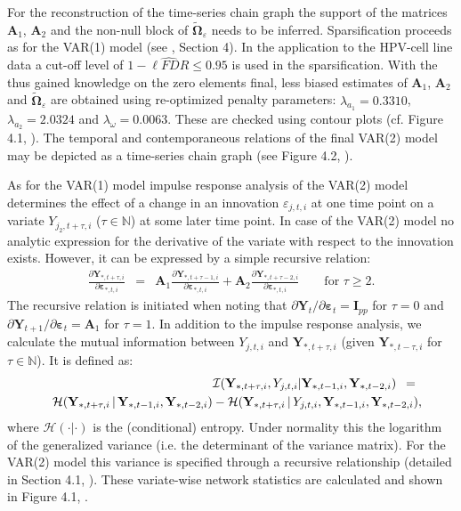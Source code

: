 For the reconstruction of the time-series chain graph the support of the matrices $\mathbf{A}_1$, $\mathbf{A}_2$ and the non-null block  of $\tilde{\mathbf{\Omega}}_{\varepsilon}$ needs to be inferred. Sparsification proceeds as for the VAR(1) model (see \cite{Miok2017}, Section 4). In the application to the HPV-cell line data a cut-off level of $1-\widehat{\ell FDR} \le 0.95$  is used in the sparsification. With the thus gained knowledge on the zero elements final, less biased estimates of $\mathbf{A}_1$, $\mathbf{A}_2$ and $\tilde{\mathbf{\Omega}}_{\varepsilon}$ are obtained using re-optimized penalty parameters: $\lambda_{a_{1}}=0.3310$, $\lambda_{a_{2}}=2.0324$ and $\lambda_{\omega}= 0.0063$. These are checked using contour plots (cf. Figure 4.1, \citep{Supp2018}). The temporal and contemporaneous relations of the final VAR(2) model may be depicted as a time-series chain graph (see Figure 4.2, \cite{Supp2018}).

As for the VAR(1) model impulse response analysis of the VAR(2) model determines the effect of a change in an innovation $\varepsilon_{j,t,i}$ at one time point on a variate $Y_{j_2,t+\tau, i}$ ($\tau \in \mathbb{N}$) at some later time point. In case of the VAR(2) model no analytic expression for the derivative of the variate with respect to the innovation exists. However, it can be expressed by a simple recursive relation:
\begin{eqnarray*}
\frac{\partial \mathbf{Y}_{*,t+\tau,i}}{\partial \boldsymbol{\varepsilon}_{*,t,i}} & = & \mathbf{A}_1 \frac{\partial \mathbf{Y}_{\ast, t+\tau-1, i} }{\partial\boldsymbol{\varepsilon}_{\ast,t,i}} +  \mathbf{A}_2 \frac{\partial  \mathbf{Y}_{\ast, t+\tau-2, i} }{\partial\boldsymbol{\varepsilon}_{\ast,t,i}} \qquad \mbox{for } \tau \geq 2.
\end{eqnarray*}
The recursive relation is initiated when noting that $\partial \mathbf{Y}_{t} \slash \partial \boldsymbol{\varepsilon}_{t} =  \mathbf{I}_{pp}$ for $\tau = 0$ and $\partial \mathbf{Y}_{t+1} \slash \partial \boldsymbol{\varepsilon}_{t} = \mathbf{A}_1$ for $\tau = 1$. In addition to the impulse response analysis, we calculate the mutual information between $Y_{j,t,i}$ and $\mathbf{Y}_{\ast,t+\tau,i}$ (given $\mathbf{Y}_{*,t-\tau,i}$ for $\tau \in \mathbb{N}$). It is defined as:
\begin{eqnarray*}
& & \hspace{-1cm} \mathcal{I}(\mathbf{Y}_{\ast,t+\tau,i},Y_{j,t,i}|\mathbf{Y}_{*,t-1,i},\mathbf{Y}_{*,t-2,i}) \, \, \, = \, \, \,
\\
& & \mathcal{H}(\mathbf{Y}_{*,t+\tau,i} \, | \, \mathbf{Y}_{*,t-1,i},\mathbf{Y}_{*,t-2,i}) - \mathcal{H}(\mathbf{Y}_{*,t+\tau,i} \, | \, Y_{j,t,i},\mathbf{Y}_{*,t-1,i},\mathbf{Y}_{*,t-2,i}),
\end{eqnarray*}
where $\mathcal{H}(\cdot|\cdot)$ is the (conditional) entropy. Under normality this the logarithm of the generalized variance (i.e. the determinant of the variance matrix). For the VAR(2) model this variance is specified through a recursive relationship (detailed in Section 4.1, \cite{Supp2018}). These variate-wise network statistics are calculated and shown in Figure 4.1, \cite{Supp2018}.


